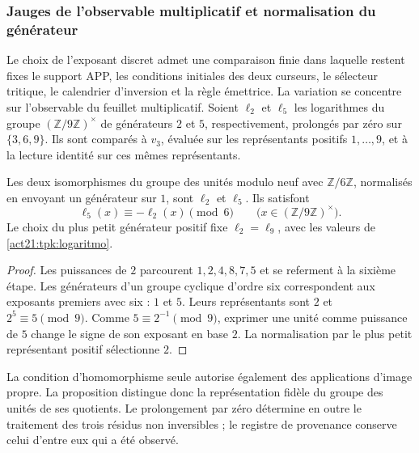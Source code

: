 \subsubsection{Jauges de l'observable multiplicatif et normalisation du générateur}
\label{mg05:calibres}

Le choix de l'exposant discret admet une comparaison finie dans laquelle restent fixes le support APP, les conditions initiales des deux curseurs, le sélecteur tritique, le calendrier d'inversion et la règle émettrice. La variation se concentre sur l'observable du feuillet multiplicatif. Soient \(\ell_{2}\) et \(\ell_{5}\) les logarithmes du groupe \((\mathbb Z/9\mathbb Z)^\times\) de générateurs \(2\) et \(5\), respectivement, prolongés par zéro sur \(\{3,6,9\}\). Ils sont comparés à \(v_3\), évaluée sur les représentants positifs \(1,\ldots,9\), et à la lecture identité sur ces mêmes représentants.

\begin{proposition}
\label{mg05:normalizacion}
Les deux isomorphismes du groupe des unités modulo neuf avec
\(\mathbb Z/6\mathbb Z\), normalisés en envoyant un générateur sur
\(1\), sont \(\ell_2\) et \(\ell_5\). Ils satisfont
\[
 \ell_5(x)\equiv-\ell_2(x)\pmod6
 \qquad\bigl(x\in(\mathbb Z/9\mathbb Z)^\times\bigr).
\]
Le choix du plus petit générateur positif fixe \(\ell_2=\ell_9\),
avec les valeurs de \eqref{act21:tpk:logaritmo}.
\end{proposition}
\begin{proof}
Les puissances de \(2\) parcourent \(1,2,4,8,7,5\) et se referment à la
sixième étape. Les générateurs d'un groupe cyclique d'ordre six
correspondent aux exposants premiers avec six : \(1\) et \(5\).
Leurs représentants sont \(2\) et \(2^5\equiv5\pmod9\).
Comme \(5\equiv2^{-1}\pmod9\), exprimer une unité comme puissance de
\(5\) change le signe de son exposant en base \(2\). La
normalisation par le plus petit représentant positif sélectionne \(2\).
\end{proof}

La condition d'homomorphisme seule autorise également des applications
d'image propre. La proposition distingue donc la représentation
fidèle du groupe des unités de ses quotients. Le prolongement par zéro
détermine en outre le traitement des trois résidus non inversibles ;
le registre de provenance conserve celui d'entre eux qui a été observé.

